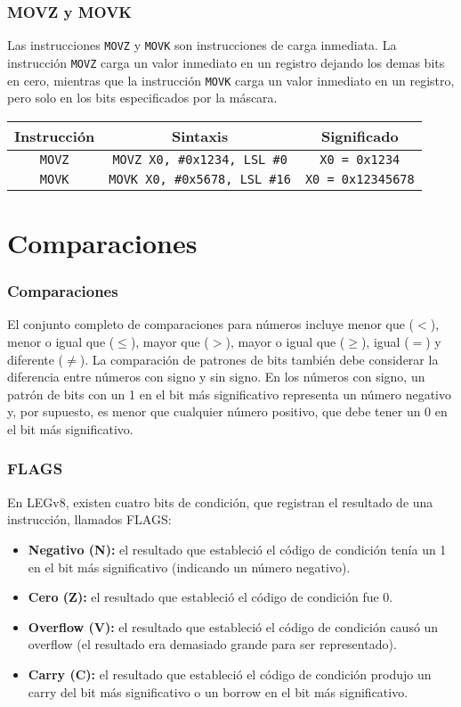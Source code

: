 \documentclass[aspectradio=43]{beamer}
\begin{document}
\begin{frame}
    \frametitle{MOVZ y MOVK}
    Las instrucciones \texttt{MOVZ} y \texttt{MOVK} son instrucciones de carga inmediata. La instrucción \texttt{MOVZ} carga un valor inmediato en un registro dejando los demas bits en cero, mientras que la instrucción \texttt{MOVK} carga un valor inmediato en un registro, pero solo en los bits especificados por la máscara.\\
    \begin{table}
        \begin{tabular}{|c|c|c|}
            \hline
            \rowcolor{orange!20}
            \textbf{Instrucción} & \textbf{Sintaxis} & \textbf{Significado} \\
            \hline
            \texttt{MOVZ} & \texttt{MOVZ X0, \#0x1234, LSL \#0} & \texttt{X0 = 0x1234} \\
            \texttt{MOVK} & \texttt{MOVK X0, \#0x5678, LSL \#16} & \texttt{X0 = 0x12345678} \\
            \hline
        \end{tabular}
    \end{table}
\end{frame}

\section{Comparaciones}
\begin{frame}
    \frametitle{Comparaciones}
    El conjunto completo de comparaciones para números incluye menor que ($<$), menor o igual que ($\leq$), mayor que ($>$), mayor o igual que ($\geq$), igual ($=$) y diferente ($\neq$). La comparación de patrones de bits también debe considerar la diferencia entre números con signo y sin signo. En los números con signo, un patrón de bits con un 1 en el bit más significativo representa un número negativo y, por supuesto, es menor que cualquier número positivo, que debe tener un 0 en el bit más significativo.
\end{frame}

\begin{frame}
    \frametitle{FLAGS}
    En LEGv8, existen cuatro bits de condición, que registran el resultado de una instrucción, llamados FLAGS:
    \begin{itemize}
        \item \textbf{Negativo (N):} el resultado que estableció el código de condición tenía un 1 en el bit más significativo (indicando un número negativo).
        \item \textbf{Cero (Z):} el resultado que estableció el código de condición fue 0.
        \item \textbf{Overflow (V):} el resultado que estableció el código de condición causó un overflow (el resultado era demasiado grande para ser representado).
        \item \textbf{Carry (C):} el resultado que estableció el código de condición produjo un carry del bit más significativo o un borrow en el bit más significativo.
    \end{itemize}
\end{frame}
\end{document}
